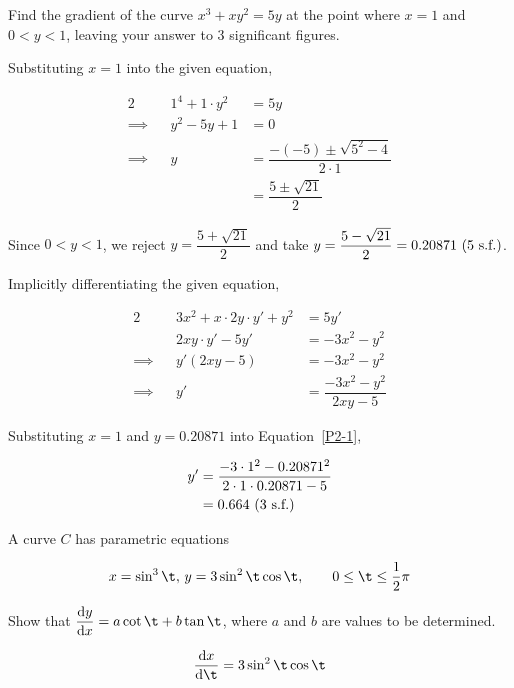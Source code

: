\documentclass{echw}
\begin{document}
    \problem{}
        Find the gradient of the curve $x^3 + xy^2 = 5y$ at the point where $x=1$ and $0 < y < 1$, leaving your answer to 3 significant figures.

    \solution
        Substituting $x=1$ into the given equation,

        \begin{alignat*}{2}
            &&1^4 + 1\cdot y^2 &= 5y\\
            \implies&&y^2-5y+1&=0\\
            \implies&&y &= \dfrac{-(-5)\pm\sqrt{5^2-4}}{2\cdot1}\\
            && &= \dfrac{5\pm\sqrt{21}}2
        \end{alignat*}

        Since $0 < y < 1$, we reject $y = \dfrac{5+\sqrt{21}}2$ and take $y = \dfrac{5-\sqrt{21}}2 = 0.20871 \text{ (5 s.f.)}$.

        Implicitly differentiating the given equation,

        \begin{alignat}{2}
            &&3x^2+x\cdot2y\cdot y' + y^2 &= 5y' \nonumber\\
            &&2xy\cdot y' - 5y' &= -3x^2-y^2 \nonumber\\
            \implies&&y'(2xy-5)&=-3x^2-y^2 \nonumber\\
            \implies&&y' &= \dfrac{-3x^2-y^2}{2xy-5}\label{P2-1}
        \end{alignat}

        Substituting $x=1$ and $y=0.20871$ into Equation~\ref{P2-1}, 

        \begin{align*}
            y' &= \dfrac{-3\cdot1^2-0.20871^2}{2\cdot 1 \cdot 0.20871-5}\\
            &= 0.664 \text{ (3 s.f.)}
        \end{align*}


    \problem{}
        A curve $C$ has parametric equations

        \begin{equation*}
            x = \sin^3 \t, \, y = 3 \sin^2 \t \cos \t, \qquad 0 \leq \t \leq \dfrac12 \pi
        \end{equation*}

        Show that $\der{y}{x} = a\cot \t + b\tan \t$, where $a$ and $b$ are values to be determined.

    \solution
        \begin{equation*}
            \der{x}{\t} = 3\sin^2\t\cos\t
        \end{equation*}
\end{document}
